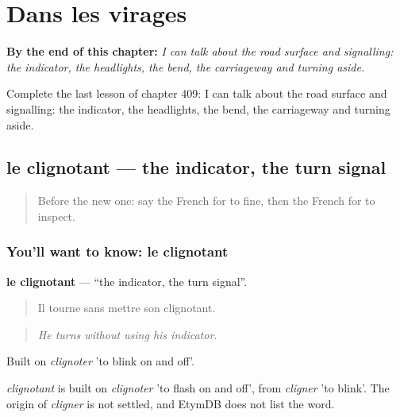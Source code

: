 
\chapter{Dans les virages}
\label{ch:fr-dans-les-virages}

\begin{chapteropening}
\textbf{By the end of this chapter:} \emph{I can talk about the road surface and signalling: the indicator, the headlights, the bend, the carriageway and turning aside.}

Complete the last lesson of chapter 409: I can talk about the road surface and signalling: the indicator, the headlights, the bend, the carriageway and turning aside.
\end{chapteropening}

\section[le clignotant]{le clignotant — the indicator, the turn signal}

\label{lesson:FR-C409-clignotant}



\begin{quote}
Before the new one: say the French for to fine, then the French for to inspect.
\end{quote}

\subsection*{You'll want to know: le clignotant}
\textbf{le clignotant} — \textquotedblleft{}the indicator, the turn signal\textquotedblright{}.

\begin{quote}
Il tourne sans mettre son clignotant.
\end{quote}

\begin{quote}
\emph{He turns without using his indicator.}
\end{quote}

Built on \emph{clignoter} 'to blink on and off'.

\begin{cousinweb}
\emph{clignotant} is built on \emph{clignoter} 'to flash on and off', from \emph{cligner} 'to blink'. The origin of \emph{cligner} is not settled, and EtymDB does not list the word.
\end{cousinweb}

